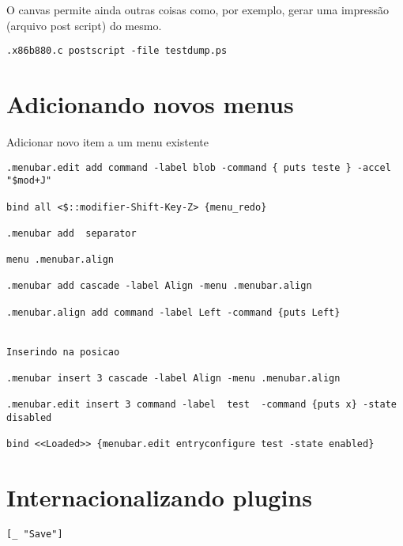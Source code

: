 O canvas permite ainda outras coisas como, por exemplo, gerar uma impressão
(arquivo post script) do mesmo.

\begin{lstlisting}
.x86b880.c postscript -file testdump.ps
\end{lstlisting}

\section{Adicionando novos menus}

Adicionar novo item a um menu existente

\begin{lstlisting}
.menubar.edit add command -label blob -command { puts teste } -accel "$mod+J"

bind all <$::modifier-Shift-Key-Z> {menu_redo}

.menubar add  separator

menu .menubar.align

.menubar add cascade -label Align -menu .menubar.align

.menubar.align add command -label Left -command {puts Left}


Inserindo na posicao 

.menubar insert 3 cascade -label Align -menu .menubar.align

.menubar.edit insert 3 command -label  test  -command {puts x} -state disabled

bind <<Loaded>> {menubar.edit entryconfigure test -state enabled}
\end{lstlisting}

\section{Internacionalizando plugins}

\begin{lstlisting}
[_ "Save"]
\end{lstlisting}


